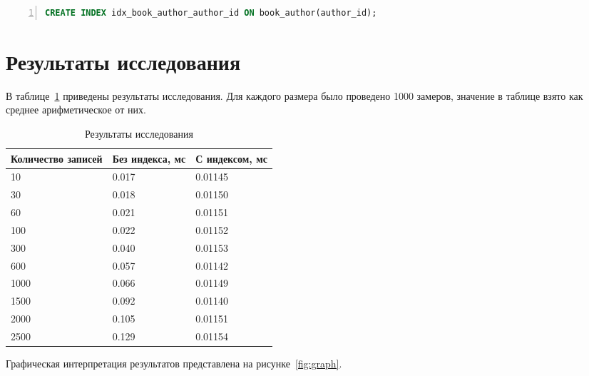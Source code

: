 \begin{center}
	\captionsetup{justification=raggedright,singlelinecheck=off}
	\begin{lstlisting}[language=sql, frame=single, numbers=left, label=lst:index_2, caption=Создание роли модератора]
CREATE INDEX idx_book_author_author_id ON book_author(author_id);
	\end{lstlisting}
\end{center}

\section{Результаты исследования}

В таблице~\ref{tbl:time} приведены результаты исследования. Для каждого размера было проведено 1000 замеров, значение в таблице взято как среднее арифметическое от них.

\begin{table}[H]
	\begin{center}
		\caption{Результаты исследования}
		\begin{tabular}{|l|l|l|}
			\hline
			\textbf{Количество записей} & \textbf{Без индекса, мс} & \textbf{С индексом, мс} \\
			\hline
			10 & 0.017 & 0.01145 \\
			\hline
			30 & 0.018 & 0.01150 \\
			\hline
			60 & 0.021 & 0.01151 \\
			\hline
			100 & 0.022 & 0.01152 \\
			\hline
			300 & 0.040 & 0.01153 \\
			\hline
			600 & 0.057 & 0.01142 \\
			\hline
			1000 & 0.066 & 0.01149 \\
			\hline
			1500 & 0.092 & 0.01140 \\
			\hline
			2000 & 0.105 & 0.01151 \\
			\hline
			2500 & 0.129 & 0.01154 \\
			\hline
		\end{tabular}
		\label{tbl:time}
	\end{center}
\end{table}

\clearpage
Графическая интерпретация результатов представлена на рисунке~\ref{fig:graph}.

